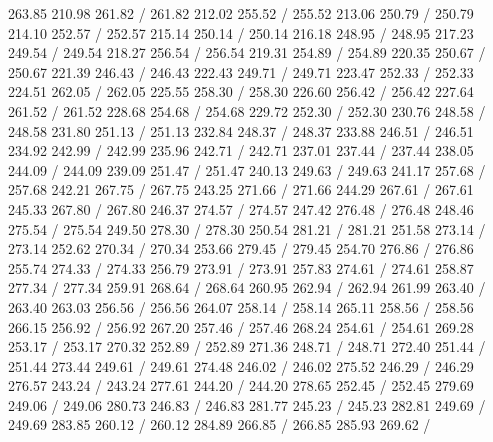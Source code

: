 { 263.85 210.98 261.82 /
 261.82 212.02 255.52 /
 255.52 213.06 250.79 /
 250.79 214.10 252.57 /
 252.57 215.14 250.14 /
 250.14 216.18 248.95 /
 248.95 217.23 249.54 /
 249.54 218.27 256.54 /
 256.54 219.31 254.89 /
 254.89 220.35 250.67 /
 250.67 221.39 246.43 /
 246.43 222.43 249.71 /
 249.71 223.47 252.33 /
 252.33 224.51 262.05 /
 262.05 225.55 258.30 /
 258.30 226.60 256.42 /
 256.42 227.64 261.52 /
 261.52 228.68 254.68 /
 254.68 229.72 252.30 /
 252.30 230.76 248.58 /
 248.58 231.80 251.13 /
 251.13 232.84 248.37 /
 248.37 233.88 246.51 /
 246.51 234.92 242.99 /
 242.99 235.96 242.71 /
 242.71 237.01 237.44 /
 237.44 238.05 244.09 /
 244.09 239.09 251.47 /
 251.47 240.13 249.63 /
 249.63 241.17 257.68 /
 257.68 242.21 267.75 /
 267.75 243.25 271.66 /
 271.66 244.29 267.61 /
 267.61 245.33 267.80 /
 267.80 246.37 274.57 /
 274.57 247.42 276.48 /
 276.48 248.46 275.54 /
 275.54 249.50 278.30 /
 278.30 250.54 281.21 /
 281.21 251.58 273.14 /
 273.14 252.62 270.34 /
 270.34 253.66 279.45 /
 279.45 254.70 276.86 /
 276.86 255.74 274.33 /
 274.33 256.79 273.91 /
 273.91 257.83 274.61 /
 274.61 258.87 277.34 /
 277.34 259.91 268.64 /
 268.64 260.95 262.94 /
 262.94 261.99 263.40 /
 263.40 263.03 256.56 /
 256.56 264.07 258.14 /
 258.14 265.11 258.56 /
 258.56 266.15 256.92 /
 256.92 267.20 257.46 /
 257.46 268.24 254.61 /
 254.61 269.28 253.17 /
 253.17 270.32 252.89 /
 252.89 271.36 248.71 /
 248.71 272.40 251.44 /
 251.44 273.44 249.61 /
 249.61 274.48 246.02 /
 246.02 275.52 246.29 /
 246.29 276.57 243.24 /
 243.24 277.61 244.20 /
 244.20 278.65 252.45 /
 252.45 279.69 249.06 /
 249.06 280.73 246.83 /
 246.83 281.77 245.23 /
 245.23 282.81 249.69 /
 249.69 283.85 260.12 /
 260.12 284.89 266.85 /
 266.85 285.93 269.62 /
}
